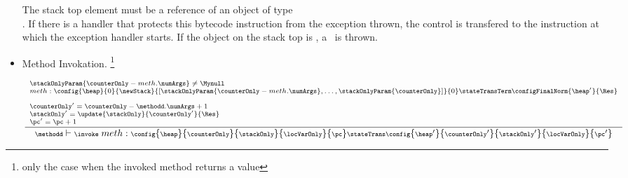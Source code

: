 \begin{itemize}
           The stack top element  must be a reference of an object of type \\ \Throwable. 
	  If there is a handler that protects this bytecode instruction from the exception thrown, the control is transfered
	  to the instruction at which the exception handler starts. %
	  If the object on the stack top is \Mynull, a \NullPointerExc \ is thrown. 

 \item Method Invokation. \invoke \footnote{ only the case when  the invoked method returns a value}
      
         $$ {\scriptsize \frac{\begin{array}{l} \stackOnlyParam{ \counterOnly - meth.\numArgs } \neq \Mynull   \\
	                         meth : %
			                        \config{\heap}       
                                                       {0}
						       {\newStack }
                                                       {\lbrack \stackOnlyParam{ \counterOnly - meth.\numArgs },\ldots ,\stackOnlyParam{ \counterOnly} \rbrack }
						       {0} 
						         \stateTransTerm 
							 \configFinalNorm{\heap'}{\Res}\\
                                                   \\
						   \counterOnly' = \counterOnly - \methodd.\numArgs + 1 \\
						   \stackOnly' = \update{\stackOnly}{\counterOnly'}{\Res} \\
						   \pc' = \pc + 1
			         \end{array} 	      
	         }	         
	         {\methodd \vdash \invoke \  meth :  \config{\heap}{\counterOnly}{\stackOnly}{\locVarOnly}{\pc} 
		                        \stateTrans  
					\config{\heap' }{\counterOnly'}{\stackOnly' }{\locVarOnly}{\pc'}} } $$
	  

\end{itemize}
